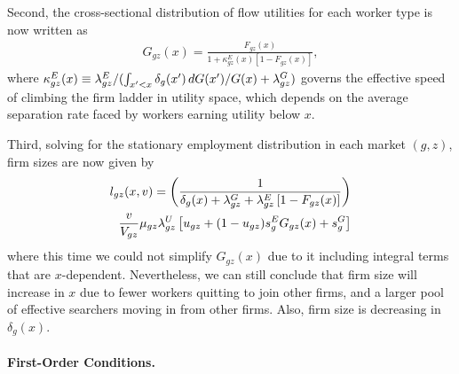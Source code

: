 Second, the cross-sectional distribution of flow utilities for each worker type is now written as
\begin{align}
    G_{gz}(x) = \frac{F_{gz}(x)}{1 + \kappa_{gz}^{E}(x) \left[1 - F_{gz}(x)\right]},
    \label{eq:from_F_to_G_hetdelta}
\end{align}
%
where $\kappa_{gz}^{E}(x) \equiv \lambda_{gz}^{E}/(\int_{x' < x} \delta_{g}(x') \mathop{}\!{d} G(x') / G(x) + \lambda_{gz}^{G})$ governs the effective speed of climbing the firm ladder in utility space, which depends on the average separation rate faced by workers earning utility below $x$.

Third, solving for the stationary employment distribution in each market $(g, z)$, firm sizes are now given by
\begin{align}
    l_{gz}(x,v) = \left( \frac{1}{\delta_{g}(x) + \lambda_{gz}^{G} + \lambda_{gz}^{E} \left[1 - F_{gz}(x)\right]} \right) \label{eq:size_stationary_hetdelta} \\
    \frac{v}{V_{gz}} \mu_{gz} \lambda_{gz}^{U} \left[ u_{gz} + (1 - u_{gz}) s_{g}^{E} G_{gz}(x) + s_{g}^{G} \right] \notag
\end{align}
%
where this time we could not simplify $G_{gz}(x)$ due to it including integral terms that are $x$-dependent. Nevertheless, we can still conclude that firm size will increase in $x$ due to fewer workers quitting to join other firms, and a larger pool of effective searchers moving in from other firms. Also, firm size is decreasing in $\delta_g(x)$.


\paragraph{First-Order Conditions.}

